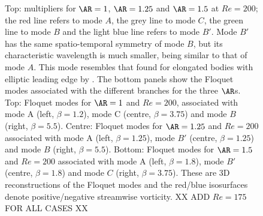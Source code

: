\begin{figure}
  \caption{Top: multipliers for $\AR=1$, $\AR=1.25$ and $\AR=1.5$ at $Re=200$; the red line refers to mode $A$, the grey line to mode $C$, the green line to mode $B$ and the light blue line refers to mode $B'$. Mode $B'$ has the same spatio-temporal symmetry of mode $B$, but its characteristic wavelength is much smaller, being similar to that of mode $A$. This mode resembles that found for elongated bodies with elliptic leading edge by \cite{ryan-etal-2005}. The bottom panels show the Floquet modes associated with the different branches for the three $\AR$s. Top: Floquet modes for $\AR=1$ and $Re=200$, associated with mode A (left, $\beta=1.2$), mode C (centre, $\beta=3.75$) and mode $B$ (right, $\beta=5.5$). Centre: Floquet modes for $\AR=1.25$ and $Re=200$ associated with mode A (left, $\beta=1.25$), mode $B'$ (centre, $\beta = 1.25$) and mode $B$ (right, $\beta=5.5$). Bottom: Floquet modes for $\AR=1.5$ and $Re=200$ associated with mode A (left, $\beta=1.8$), mode $B'$ (centre, $\beta=1.8$) and mode $C$ (right, $\beta=3.75$). These are 3D reconstructions of the Floquet modes and the red/blue isosurfaces denote positive/negative streamwise vorticity. XX ADD $Re=175$ FOR ALL CASES XX}
  \label{fig:xx}
\end{figure}


